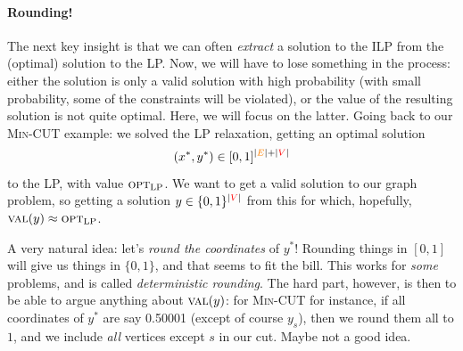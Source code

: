 \paragraph{Rounding!} The next key insight is that we can often \emph{extract} a solution to the ILP from the (optimal) solution to the LP. Now, we will have to lose something in the process: either the solution is only a valid solution with high probability (with small probability, some of the constraints will be violated), or the value of the resulting solution is not quite optimal. Here, we will focus on the latter. Going back to our \textsc{Min-CUT} example: we solved the LP relaxation, getting an optimal solution
\[
    (x^\ast, y^\ast) \in [0,1]^{|\textcolor{orange}{E}|+|\textcolor{red}{V}|}
\]
to the LP, with value ${\textsc{opt}}_{\rm LP}$. We want to get a valid solution to our graph problem, so getting a solution $y \in \{0,1\}^{|\textcolor{red}{V}|}$ from this for which, hopefully, ${\textsc{val}}(y) \approx {\textsc{opt}}_{\rm LP}$.

A very natural idea: let's \emph{round the coordinates} of $y^\ast$! Rounding things in $[0,1]$ will give us things in $\{0,1\}$, and that seems to fit the bill. This works for \emph{some} problems, and is called \emph{deterministic rounding}. The hard part, however, is then to be able to argue anything about ${\textsc{val}}(y)$: for \textsc{Min-CUT} for instance, if all coordinates of $y^\ast$ are say 0.50001 (except of course $y_s$), then we round them all to $1$, and we include \emph{all} vertices except $s$ in our cut. Maybe not a good idea.

